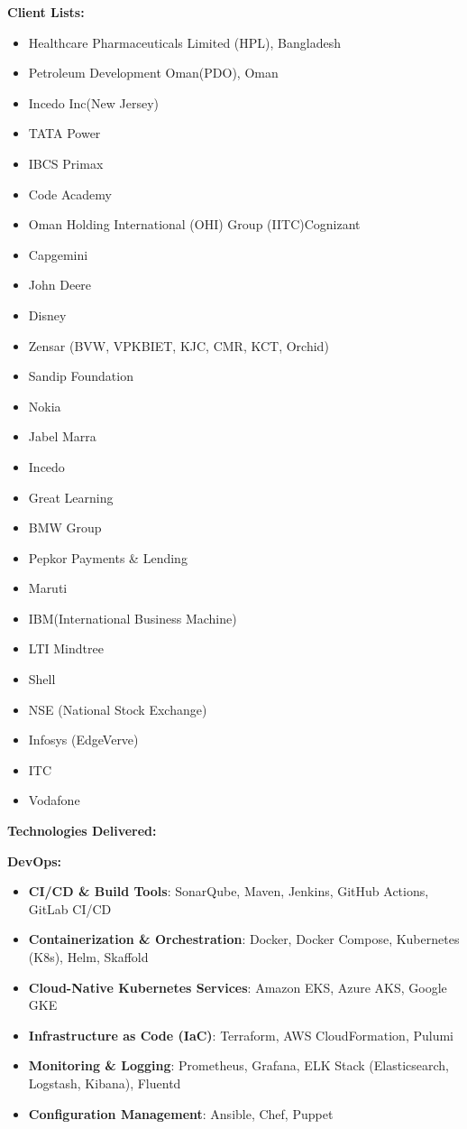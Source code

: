 \documentclass[a4paper]{article}
\begin{document}
\textbf{Client Lists:}

\begin{itemize}
\item
  Healthcare Pharmaceuticals Limited (HPL), Bangladesh
\item
  Petroleum Development Oman(PDO), Oman
\item
  Incedo Inc(New Jersey)
\item
  TATA Power
\item
  IBCS Primax
\item
  Code Academy
\item
  Oman Holding International (OHI) Group (IITC)Cognizant
\item
  Capgemini
\item
  John Deere
\item
  Disney
\item
  Zensar (BVW, VPKBIET, KJC, CMR, KCT, Orchid)
\item
  Sandip Foundation
\item
  Nokia
\item
  Jabel Marra
\item
  Incedo
\item
  Great Learning
\item
  BMW Group
\item
  Pepkor Payments \& Lending
\item
  Maruti
\item
  IBM(International Business Machine)
\item
  LTI Mindtree
\item
  Shell
\item
  NSE (National Stock Exchange)
\item
  Infosys (EdgeVerve)
\item
  ITC
\item
  Vodafone
\end{itemize}

\textbf{Technologies Delivered:}

\textbf{DevOps:}

\begin{itemize}
\item
  \textbf{CI/CD \& Build Tools}: SonarQube, Maven, Jenkins, GitHub
  Actions, GitLab CI/CD
\item
  \textbf{Containerization \& Orchestration}: Docker, Docker Compose,
  Kubernetes (K8s), Helm, Skaffold
\item
  \textbf{Cloud-Native Kubernetes Services}: Amazon EKS, Azure AKS,
  Google GKE
\item
  \textbf{Infrastructure as Code (IaC)}: Terraform, AWS CloudFormation,
  Pulumi
\item
  \textbf{Monitoring \& Logging}: Prometheus, Grafana, ELK Stack
  (Elasticsearch, Logstash, Kibana), Fluentd
\item
  \textbf{Configuration Management}: Ansible, Chef, Puppet
\end{itemize}
\end{document}
